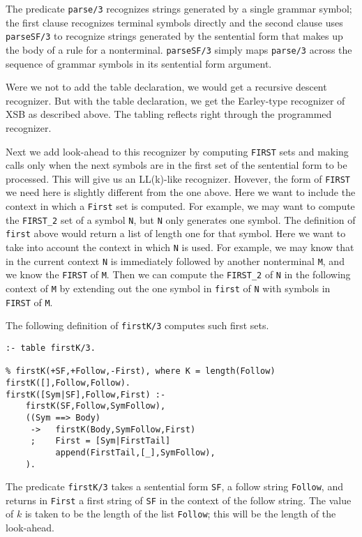 The predicate \verb|parse/3| recognizes strings generated by a single
grammar symbol; the first clause recognizes terminal symbols directly
and the second clause uses \verb|parseSF/3| to recognize strings
generated by the sentential form that makes up the body of a rule for
a nonterminal.  \verb|parseSF/3| simply maps \verb|parse/3| across the
sequence of grammar symbols in its sentential form argument.

Were we not to add the table declaration, we would get a recursive
descent recognizer.  But with the table declaration, we get the
Earley-type recognizer of XSB as described above.  The tabling
reflects right through the programmed recognizer.

Next we add look-ahead to this recognizer by computing \verb|FIRST|
sets and making calls only when the next symbols are in the first set
of the sentential form to be processed.  This will give us an
LL(k)-like recognizer.  Hovever, the form of \verb|FIRST| we need here
is slightly different from the one above.  Here we want to include the
context in which a \verb|First| set is computed.  For example, we may
want to compute the \verb|FIRST_2| set of a symbol \verb|N|, but
\verb|N| only generates one symbol.  The definition of \verb|first|
above would return a list of length one for that symbol.  Here we want
to take into account the context in which \verb|N| is used.  For
example, we may know that in the current context \verb|N| is
immediately followed by another nonterminal \verb|M|, and we know the
\verb|FIRST| of \verb|M|.  Then we can compute the \verb|FIRST_2| of
\verb|N| in the following context of \verb|M| by extending out the one
symbol in \verb|first| of \verb|N| with symbols in \verb|FIRST| of
\verb|M|.

The following definition of \verb|firstK/3| computes such first sets.
\begin{verbatim}
:- table firstK/3.

% firstK(+SF,+Follow,-First), where K = length(Follow)
firstK([],Follow,Follow).
firstK([Sym|SF],Follow,First) :-
    firstK(SF,Follow,SymFollow),
    ((Sym ==> Body)
     ->   firstK(Body,SymFollow,First)
     ;    First = [Sym|FirstTail]
          append(FirstTail,[_],SymFollow),
    ).
\end{verbatim}

The predicate \verb|firstK/3| takes a sentential form \verb|SF|, a
follow string \verb|Follow|, and returns in \verb|First| a first
string of \verb|SF| in the context of the follow string.  The value of
$k$ is taken to be the length of the list \verb|Follow|; this will be
the length of the look-ahead.

